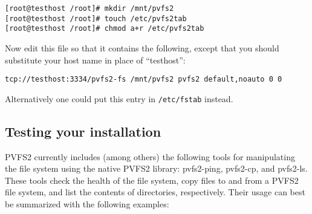 \documentclass[11pt, letterpaper]{article}
\begin{document}
\begin{verbatim}
[root@testhost /root]# mkdir /mnt/pvfs2
[root@testhost /root]# touch /etc/pvfs2tab
[root@testhost /root]# chmod a+r /etc/pvfs2tab
\end{verbatim}

Now edit this file so that it contains the following, except that you should
substitute your host name in place of ``testhost'':

\begin{verbatim}
tcp://testhost:3334/pvfs2-fs /mnt/pvfs2 pvfs2 default,noauto 0 0 
\end{verbatim}

Alternatively one could put this entry in \texttt{/etc/fstab} instead.

\subsection{Testing your installation}
\label{subsec:testing}
PVFS2 currently includes (among others) the following tools for
manipulating the file system using the native PVFS2 library:
pvfs2-ping, pvfs2-cp, and pvfs2-ls.  These tools
check the health of the file system, copy files to and from a PVFS2 file system, and list the
contents of directories, respectively.  Their usage
can best be summarized with the following examples:
\end{document}
